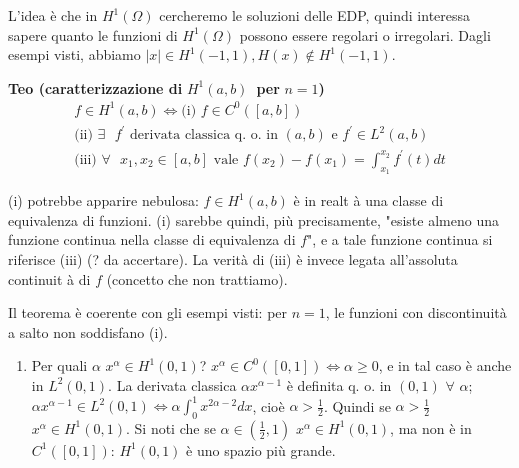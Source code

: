 \documentclass{article}
\begin{document}
L'idea \`{e} che in $H^{1}\left( \Omega \right) $ cercheremo le soluzioni
delle EDP, quindi interessa sapere quanto le funzioni di $H^{1}\left( \Omega
\right) $ possono essere regolari o irregolari. Dagli esempi visti, abbiamo $%
\left\vert x\right\vert \in H^{1}\left( -1,1\right) ,H\left( x\right)
\not\in H^{1}\left( -1,1\right) $.

\textbf{Teo (caratterizzazione di }$H^{1}\left( a,b\right) $\textbf{\ per }$%
n=1$\textbf{)}%
\begin{gather*}
f\in H^{1}\left( a,b\right) \Longleftrightarrow \text{(i) }f\in C^{0}\left( %
\left[ a,b\right] \right) \\
\text{(ii) }\exists \text{ }f^{\prime }\text{ derivata classica q. o. in }%
\left( a,b\right) \text{ e }f^{\prime }\in L^{2}\left( a,b\right) \\
\text{(iii) }\forall \text{ }x_{1},x_{2}\in \left[ a,b\right] \text{ vale }%
f\left( x_{2}\right) -f\left( x_{1}\right) =\int_{x_{1}}^{x_{2}}f^{\prime
}\left( t\right) dt
\end{gather*}

(i) potrebbe apparire nebulosa: $f\in H^{1}\left( a,b\right) $ \`{e} in realt%
\`{a} una classe di equivalenza di funzioni. (i) sarebbe quindi, pi\`{u}
precisamente, "esiste almeno una funzione continua nella classe di
equivalenza di $f$", e a tale funzione continua si riferisce (iii) (? da
accertare). La verit\`{a} di (iii) \`{e} invece legata all'assoluta continuit%
\`{a} di $f$ (concetto che non trattiamo).

Il teorema \`{e} coerente con gli esempi visti: per $n=1$, le funzioni con
discontinuit\`{a} a salto non soddisfano (i).

\begin{enumerate}
\item Per quali $\alpha $ $x^{\alpha }\in H^{1}\left( 0,1\right) $? $%
x^{\alpha }\in C^{0}\left( \left[ 0,1\right] \right) \Longleftrightarrow
\alpha \geq 0$, e in tal caso \`{e} anche in $L^{2}\left( 0,1\right) $. La
derivata classica $\alpha x^{\alpha -1}$ \`{e} definita q. o. in $\left(
0,1\right) $ $\forall $ $\alpha $; $\alpha x^{\alpha -1}\in L^{2}\left(
0,1\right) \Longleftrightarrow \alpha \int_{0}^{1}x^{2\alpha -2}dx$, cio\`{e}
$\alpha >\frac{1}{2}$. Quindi se $\alpha >\frac{1}{2}$ $x^{\alpha }\in
H^{1}\left( 0,1\right) $. Si noti che se $\alpha \in \left( \frac{1}{2}%
,1\right) $ $x^{\alpha }\in H^{1}\left( 0,1\right) $, ma non \`{e} in $%
C^{1}\left( \left[ 0,1\right] \right) $: $H^{1}\left( 0,1\right) $ \`{e} uno
spazio pi\`{u} grande.
\end{enumerate}
\end{document}

